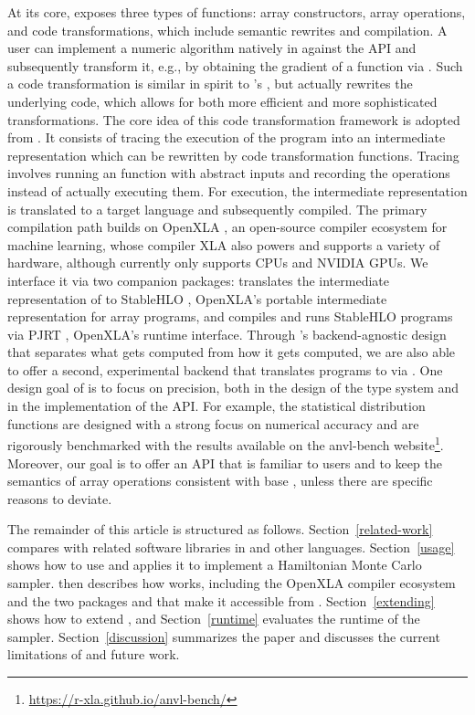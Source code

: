 \documentclass[article,shortnames]{jss}
\begin{document}
At its core,  exposes three types of functions: array constructors, array operations, and code transformations, which include semantic rewrites and compilation.
A user can implement a numeric algorithm natively in  against the  API and subsequently transform it, e.g., by obtaining the gradient of a function via .
Such a code transformation is similar in spirit to  's , but actually rewrites the underlying code, which allows for both more efficient and more sophisticated transformations.
The core idea of this code transformation framework is adopted from .
It consists of tracing the execution of the  program into an intermediate representation which can be rewritten by code transformation functions.
Tracing involves running an  function with abstract inputs and recording the operations instead of actually executing them.
For execution, the intermediate representation is translated to a target language and subsequently compiled.
The primary compilation path builds on OpenXLA \citep{ref-openxla}, an open-source compiler ecosystem for machine learning, whose compiler XLA \citep{ref-xla} also powers  and supports a variety of hardware, although  currently only supports CPUs and NVIDIA GPUs.
We interface it via two companion packages:  translates the intermediate representation of  to StableHLO \citep{ref-stablehlo}, OpenXLA's portable intermediate representation for array programs, and  compiles and runs StableHLO programs via PJRT \citep{ref-pjrt}, OpenXLA's runtime interface.
Through 's backend-agnostic design that separates what gets computed from how it gets computed, we are also able to offer a second, experimental backend that translates programs to  via  \citep{ref-quickr}.
One design goal of  is to focus on precision, both in the design of the type system and in the implementation of the API.
For example, the statistical distribution functions are designed with a strong focus on numerical accuracy and are rigorously benchmarked with the results available on the anvl-bench website\footnote{\url{https://r-xla.github.io/anvl-bench/}}.
Moreover, our goal is to offer an API that is familiar to  users and to keep the semantics of array operations consistent with base , unless there are specific reasons to deviate.

The remainder of this article is structured as follows.
Section~\ref{related-work} compares  with related software libraries in  and other languages.
Section~\ref{usage} shows how to use  and applies it to implement a Hamiltonian Monte Carlo sampler.
 then describes how  works, including the OpenXLA compiler ecosystem and the two packages  and  that make it accessible from .
Section~\ref{extending} shows how to extend , and Section~\ref{runtime} evaluates the runtime of the sampler.
Section~\ref{discussion} summarizes the paper and discusses the current limitations of  and future work.
\end{document}
